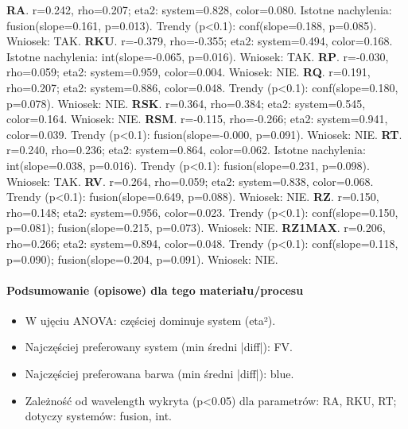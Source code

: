 \documentclass[
  10pt,
]{article}
\begin{document}
\textbf{RA}. r=0.242, rho=0.207; eta2: system=0.828, color=0.080.
Istotne nachylenia: fusion(slope=0.161, p=0.013). Trendy
(p\textless0.1): conf(slope=0.188, p=0.085). Wniosek: TAK. \textbf{RKU}.
r=-0.379, rho=-0.355; eta2: system=0.494, color=0.168. Istotne
nachylenia: int(slope=-0.065, p=0.016). Wniosek: TAK. \textbf{RP}.
r=-0.030, rho=0.059; eta2: system=0.959, color=0.004. Wniosek: NIE.
\textbf{RQ}. r=0.191, rho=0.207; eta2: system=0.886, color=0.048. Trendy
(p\textless0.1): conf(slope=0.180, p=0.078). Wniosek: NIE. \textbf{RSK}.
r=0.364, rho=0.384; eta2: system=0.545, color=0.164. Wniosek: NIE.
\textbf{RSM}. r=-0.115, rho=-0.266; eta2: system=0.941, color=0.039.
Trendy (p\textless0.1): fusion(slope=-0.000, p=0.091). Wniosek: NIE.
\textbf{RT}. r=0.240, rho=0.236; eta2: system=0.864, color=0.062.
Istotne nachylenia: int(slope=0.038, p=0.016). Trendy (p\textless0.1):
fusion(slope=0.231, p=0.098). Wniosek: TAK. \textbf{RV}. r=0.264,
rho=0.059; eta2: system=0.838, color=0.068. Trendy (p\textless0.1):
fusion(slope=0.649, p=0.088). Wniosek: NIE. \textbf{RZ}. r=0.150,
rho=0.148; eta2: system=0.956, color=0.023. Trendy (p\textless0.1):
conf(slope=0.150, p=0.081); fusion(slope=0.215, p=0.073). Wniosek: NIE.
\textbf{RZ1MAX}. r=0.206, rho=0.266; eta2: system=0.894, color=0.048.
Trendy (p\textless0.1): conf(slope=0.118, p=0.090); fusion(slope=0.204,
p=0.091). Wniosek: NIE.

\paragraph{Podsumowanie (opisowe) dla tego materiału/procesu}
\begin{itemize}
\item W ujęciu ANOVA: częściej dominuje system (eta²).
\item Najczęściej preferowany system (min średni |diff|): FV.
\item Najczęściej preferowana barwa (min średni |diff|): blue.
\item Zależność od wavelength wykryta (p<0.05) dla parametrów: RA, RKU, RT; dotyczy systemów: fusion, int.
\end{itemize}
\end{document}
